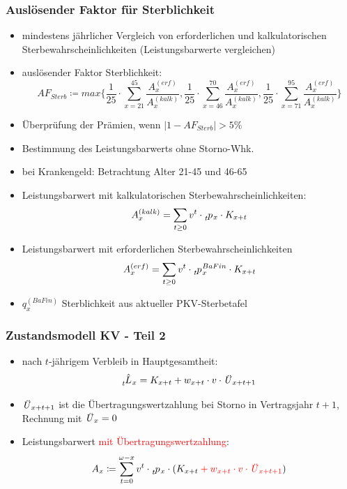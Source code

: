 \documentclass[12pt]{report}
\theoremstyle{dotless}
\theoremstyle{definition}
\begin{document}
\subsubsection{Auslösender Faktor für Sterblichkeit}
\begin{itemize}
	\item mindestens jährlicher Vergleich von erforderlichen und kalkulatorischen Sterbewahrscheinlichkeiten (Leistungsbarwerte vergleichen)
	\item auslösender Faktor Sterblichkeit:
		\begin{equation}
			AF_{Sterb} \coloneqq max\biggl\{\frac{1}{25} \cdot \sum_{x=21}^{45} \frac{A_x^{(erf)}}{A_x^{(kalk)}}, \frac{1}{25} \cdot \sum_{x=46}^{70} \frac{A_x^{(erf)}}{A_x^{(kalk)}}, \frac{1}{25} \cdot \sum_{x=71}^{95} \frac{A_x^{(erf)}}{A_x^{(kalk)}}\biggr\}
		\end{equation}
	\item Überprüfung der Prämien, wenn $|1-AF_{Sterb}|>5\%$
	\item Bestimmung des Leistungsbarwerts ohne Storno-Whk.
	\item bei Krankengeld: Betrachtung Alter 21-45 und 46-65
	\item Leistungsbarwert mit kalkulatorischen Sterbewahrscheinlichkeiten:
		\begin{equation}
			A_x^{(kalk)}=\sum_{t\geq 0} v^t \cdot \tensor[_t]{p}{}_x \cdot K_{x+t}
		\end{equation}
	\item Leistungsbarwert mit erforderlichen Sterbewahrscheinlichkeiten
		\begin{equation}
			A_x^{(erf)}=\sum_{t\geq 0} v^t \cdot \tensor[_t]{p}{}_x^{BaFin} \cdot K_{x+t}
		\end{equation}
	\item $q_x^{(BaFin)}$ Sterblichkeit aus aktueller PKV-Sterbetafel
\end{itemize}

\subsubsection{Zustandsmodell KV - Teil 2}
\begin{itemize}
	\item nach $t$-jährigem Verbleib in Hauptgesamtheit: 
		\begin{equation}
			\tensor[_t]{\hat{L}}{}_x = K_{x+t}+w_{x+t} \cdot v \cdot \text{\textit{Ü}}_{x+t+1}
		\end{equation}
	\item $\text{\textit{Ü}}_{x+t+1}$ ist die Übertragungswertzahlung bei Storno in Vertragsjahr $t+1$, Rechnung mit $\text{\textit{Ü}}_{x}=0$
	\item Leistungsbarwert \textcolor{red}{mit Übertragungswertzahlung}:
		\begin{align}
			A_x \coloneqq \sum_{t=0}^{\omega-x} v^t \cdot \tensor[_t]{p}{}_x \cdot (K_{x+t} \color{red} + w_{x+t}\cdot v \cdot \text{\textit{Ü}}_{x+t+1} \color{black})
		\end{align}
\end{itemize}
\end{document}
